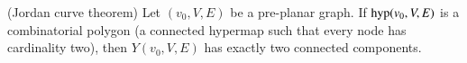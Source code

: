 %
%
%
%
%
%
%
%
%
%

\begin{lemma} (Jordan curve theorem)  Let $(v_0,V,E)$ be a pre-planar
graph.   If ${\operatorname{hyp}}(v_0,V,E)$ is a combinatorial polygon (a
connected hypermap such that every node has cardinality two), then
$Y(v_0,V,E)$ has exactly two connected components.
\end{lemma}

